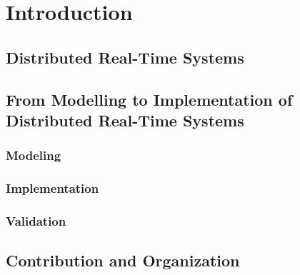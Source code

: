 \chapter{Introduction}
\section{Distributed Real-Time Systems}
\section{From Modelling to Implementation of Distributed Real-Time Systems}
\subsection{Modeling}
\subsection{Implementation}
\subsection{Validation}
\section{Contribution and Organization}
